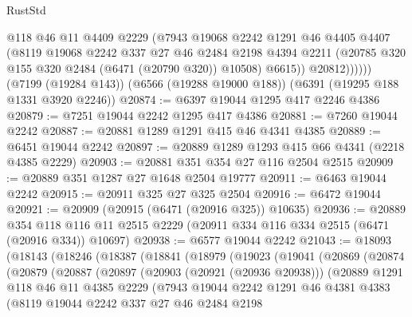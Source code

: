 \begin{lexlean}{RustStd}
\begin{coremodule}
                @118
                @46
                @11
                @4409
                @2229
                (@7943
                  @19068
                  @2242
                  @1291
                  @46
                  @4405
                  @4407
                  (@8119
                    @19068
                    @2242
                    @337
                    @27
                    @46
                    @2484
                    @2198
                    @4394
                    @2211
                    (@20785 @320 @155 @320 @2484 (@6471 (@20790 @320)) @10508)
                    @6615))
                @20812))))))
    (@7199 (@19284 @143))
    (@6566 (@19288 @19000 @188))
    (@6391 (@19295 @188 @1331 @3920 @2246))
@20874 := @6397 @19044 @1295 @417 @2246 @4386
@20879 := @7251 @19044 @2242 @1295 @417 @4386
@20881 := @7260 @19044 @2242
@20887 := @20881 @1289 @1291 @415 @46 @4341 @4385
@20889 := @6451 @19044 @2242
@20897 := @20889 @1289 @1293 @415 @66 @4341 (@2218 @4385 @2229)
@20903 := @20881 @351 @354 @27 @116 @2504 @2515
@20909 := @20889 @351 @1287 @27 @1648 @2504 @19777
@20911 := @6463 @19044 @2242
@20915 := @20911 @325 @27 @325 @2504
@20916 := @6472 @19044
@20921 := @20909 (@20915 (@6471 (@20916 @325)) @10635)
@20936 := @20889
    @354
    @118
    @116
    @11
    @2515
    @2229
    (@20911 @334 @116 @334 @2515 (@6471 (@20916 @334)) @10697)
@20938 := @6577 @19044 @2242
@21043 := @18093
    (@18143
      (@18246
        (@18387
          (@18841
            (@18979
              (@19023
                (@19041
                  (@20869
                    (@20874
                      (@20879
                        (@20887
                          (@20897
                            (@20903 (@20921 (@20936 @20938)))
                            (@20889
                              @1291
                              @118
                              @46
                              @11
                              @4385
                              @2229
                              (@7943
                                @19044
                                @2242
                                @1291
                                @46
                                @4381
                                @4383
                                (@8119
                                  @19044
                                  @2242
                                  @337
                                  @27
                                  @46
                                  @2484
                                  @2198

\end{coremodule}
\end{lexlean}

